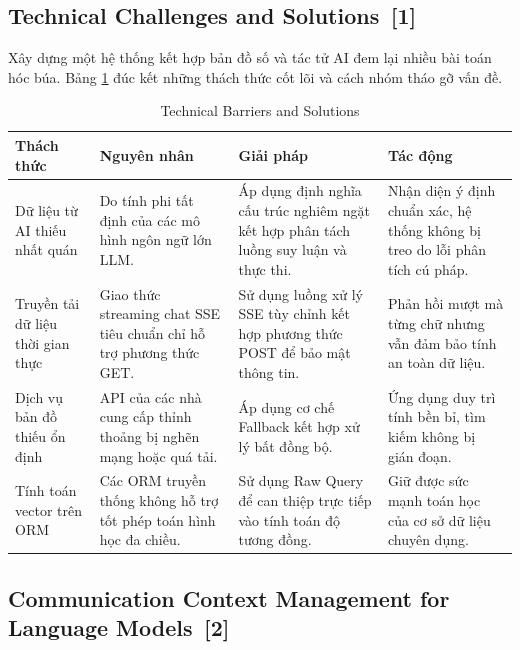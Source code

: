 \documentclass[12pt, a4paper]{article}
\begin{document}
\subsection[Technical Challenges and Solutions]{Technical Challenges and Solutions \,{\normalfont\small\textcolor{cyan!70!black}{[1]}}}
Xây dựng một hệ thống kết hợp bản đồ số và tác tử AI đem lại nhiều bài toán hóc búa. Bảng \ref{tab:challenges} đúc kết những thách thức cốt lõi và cách nhóm tháo gỡ vấn đề.

\begin{table}[H]
    \centering
    \renewcommand{\arraystretch}{1.5}
    \begin{tabularx}{\textwidth}{|>{\raggedright\arraybackslash}p{3cm}|>{\raggedright\arraybackslash}p{3cm}|>{\raggedright\arraybackslash}p{4cm}|X|}
        \hline
        \textbf{Thách thức} & \textbf{Nguyên nhân} & \textbf{Giải pháp} & \textbf{Tác động} \\
        \hline
        Dữ liệu từ AI thiếu nhất quán & Do tính phi tất định của các mô hình ngôn ngữ lớn LLM. & Áp dụng định nghĩa cấu trúc nghiêm ngặt kết hợp phân tách luồng suy luận và thực thi. & Nhận diện ý định chuẩn xác, hệ thống không bị treo do lỗi phân tích cú pháp. \\
        \hline
        Truyền tải dữ liệu thời gian thực & Giao thức streaming chat SSE tiêu chuẩn chỉ hỗ trợ phương thức GET. & Sử dụng luồng xử lý SSE tùy chỉnh kết hợp phương thức POST để bảo mật thông tin. & Phản hồi mượt mà từng chữ nhưng vẫn đảm bảo tính an toàn dữ liệu. \\
        \hline
        Dịch vụ bản đồ thiếu ổn định & API của các nhà cung cấp thỉnh thoảng bị nghẽn mạng hoặc quá tải. & Áp dụng cơ chế Fallback kết hợp xử lý bất đồng bộ. & Ứng dụng duy trì tính bền bỉ, tìm kiếm không bị gián đoạn. \\
        \hline
        Tính toán vector trên ORM & Các ORM truyền thống không hỗ trợ tốt phép toán hình học đa chiều. & Sử dụng Raw Query để can thiệp trực tiếp vào tính toán độ tương đồng. & Giữ được sức mạnh toán học của cơ sở dữ liệu chuyên dụng. \\
        \hline
    \end{tabularx}
    \caption{Technical Barriers and Solutions}
    \label{tab:challenges}
\end{table}

\subsection[Communication Context Management for Language Models]{Communication Context Management for Language Models \,{\normalfont\small\textcolor{cyan!70!black}{[2]}}}
\end{document}

